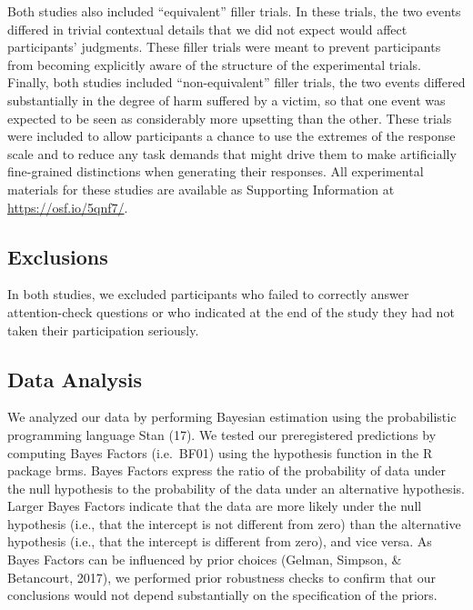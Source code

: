 \documentclass[9pt,twocolumn,twoside,]{pnas-new}
\begin{document}
{Both studies also included ``equivalent'' filler trials. In these
trials, the two events differed in trivial contextual details that we
did not expect would affect participants' judgments. These filler trials
were meant to prevent participants from becoming explicitly aware of the
structure of the experimental trials. Finally, both studies included
``non-equivalent'' filler trials, the two events differed substantially
in the degree of harm suffered by a victim, so that one event was
expected to be seen as considerably more upsetting than the other. These
trials were included to allow participants a chance to use the extremes
of the response scale and to reduce any task demands that might drive
them to make artificially fine-grained distinctions when generating
their responses. All experimental materials for these studies are
available as Supporting Information at \url{https://osf.io/5qnf7/}.

\subsection*{Exclusions}\label{exclusions}

In both studies, we excluded participants who failed to correctly answer
attention-check questions or who indicated at the end of the study they
had not taken their participation seriously.

\subsection*{Data Analysis}\label{data-analysis}

We analyzed our data by performing Bayesian estimation using the
probabilistic programming language Stan (17). We tested our
preregistered predictions by computing Bayes Factors (i.e.~BF01) using
the hypothesis function in the R package brms. Bayes Factors express the
ratio of the probability of data under the null hypothesis to the
probability of the data under an alternative hypothesis. Larger Bayes
Factors indicate that the data are more likely under the null hypothesis
(i.e., that the intercept is not different from zero) than the
alternative hypothesis (i.e., that the intercept is different from
zero), and vice versa. As Bayes Factors can be influenced by prior
choices (Gelman, Simpson, \& Betancourt, 2017), we performed prior
robustness checks to confirm that our conclusions would not depend
substantially on the specification of the priors.

}
\end{document}
